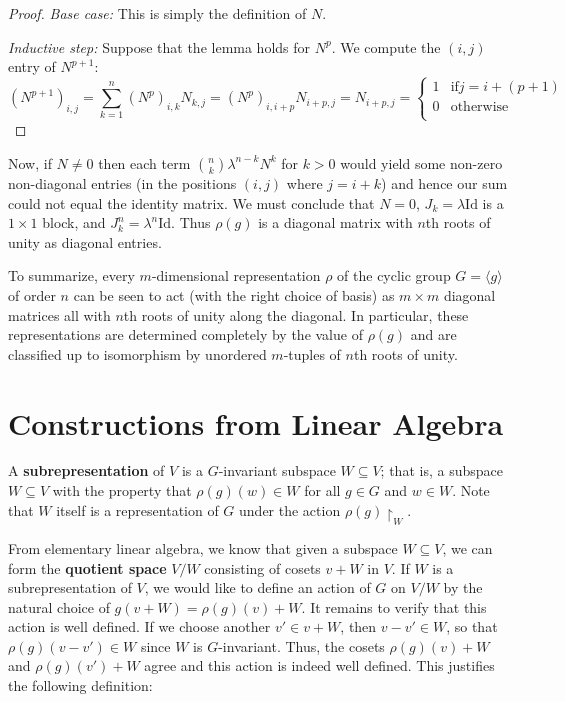 \begin{example}
\begin{lemma}
\begin{proof}
 {\textit{Base case:}} This is simply the definition of $N$.

 \textit{Inductive step:} Suppose that the lemma holds for $N^p$.  We compute the $(i,j)$ entry of $N^{p+1}$:
\[ (N^{p+1})_{i,j} = \sum_{k=1}^{n} (N^{p})_{i,k} N_{k, j} = (N^p)_{i, i +p} N_{i +p, j} = N_{i +p, j} =\begin{cases} 
      1 & \text{if}  j = i + (p +1) \\
      0 & \text{otherwise} \\
   \end{cases}  \]

\end{proof}
\end{lemma}

Now, if $N \neq 0$ then each term $\binom {n}{k} \lambda ^ {n - k } N ^k$ for $k > 0$ would yield some non-zero non-diagonal entries (in the positions $(i,j)$ where $j= i + k$) and hence our sum could not equal the identity matrix.  We must conclude that $N = 0$, $J_k = \lambda \text{Id}$ is a $1 \times 1$ block, and $J_k ^n = \lambda ^ n \text{Id}$.  Thus $\rho(g)$ is a diagonal matrix with $n$th roots of unity as diagonal entries. 

To summarize, every $m$-dimensional representation $\rho$ of the cyclic group $G = \langle g \rangle$ of order $n$ can be seen to act (with the right choice of basis) as $m \times m$ diagonal matrices all with $n$th roots of unity along the diagonal.  In particular, these representations are determined completely by the value of $\rho(g)$ and are classified up to isomorphism by unordered $m$-tuples of $n$th roots of unity.
\end{example}

\section{Constructions from Linear Algebra}
\begin{defn} A \textbf{subrepresentation} of $V$ is a $G$-invariant subspace $W \subseteq V$; that is, a subspace $W \subseteq V$ with the property that $\rho(g) (w) \in W$ for all $g \in G$ and $w \in W$.  Note that $W$ itself is a representation of $G$ under the action $\rho(g) \restriction_W$.
\end{defn}

From elementary linear algebra, we know that given a subspace $W \subseteq V$, we can form the \textbf{quotient space} $V / W$ consisting of cosets $v + W$ in $V$.  If $W$ is a subrepresentation of $V$, we would like to define an action of $G$ on $V / W$ by the natural choice of $g (v + W) = \rho(g)(v)+ W$.  It remains to verify that this action is well defined.  If we choose another $v' \in v + W$, then $v - v' \in W$, so that $\rho(g)(v - v') \in W$ since $W$ is $G$-invariant.  Thus, the cosets $\rho(g)(v) + W$ and $\rho(g)(v') + W$ agree and this action is indeed well defined. This justifies the following definition:

